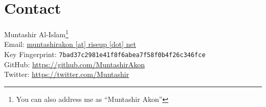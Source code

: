 \section{Contact}\label{sec:contact} %
Muntashir Al-Islam\footnote{You can also address me as ``Muntashir Akon''}\\
Email: \href{mailto:muntashirakon@riseup.net}{muntashirakon [at] riseup [dot] net}\\
Key Fingerprint: \texttt{7bad37c2981e41f8f6abea7f58f0b4f26c346fce}\\
GitHub: \url{https://github.com/MuntashirAkon}\\
Twitter: \url{https://twitter.com/Muntashir}

